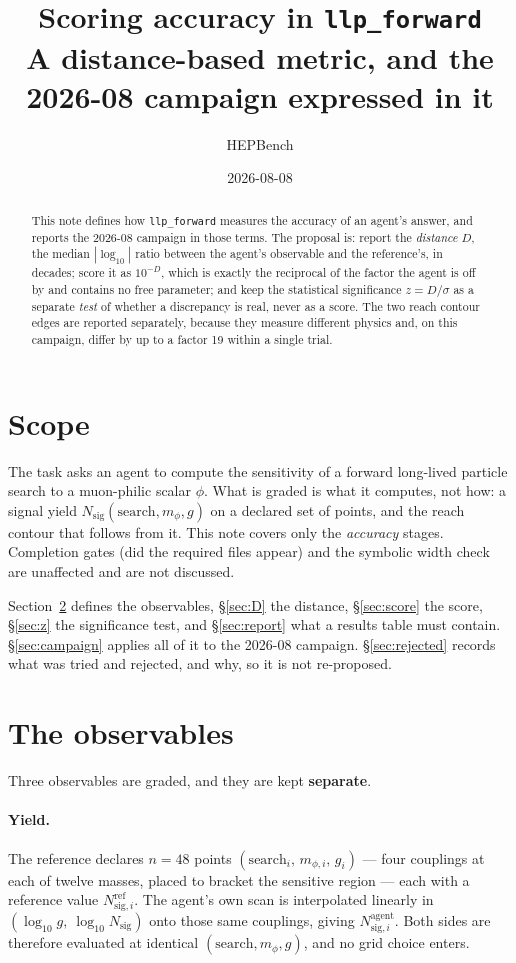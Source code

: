 \documentclass[11pt]{article}
\title{Scoring accuracy in \texttt{llp\_forward}\\
\large A distance-based metric, and the 2026-08 campaign expressed in it}
\author{HEPBench}
\date{2026-08-08}
\newcommand{\Nsig}{N_{\mathrm{sig}}}
\newcommand{\mphi}{m_\phi}
\begin{document}
\maketitle

\begin{abstract}
\noindent
This note defines how \texttt{llp\_forward} measures the accuracy of an agent's
answer, and reports the 2026-08 campaign in those terms. The proposal is: report
the \emph{distance} $D$, the median $|\log_{10}|$ ratio between the agent's
observable and the reference's, in decades; score it as $10^{-D}$, which is
exactly the reciprocal of the factor the agent is off by and contains no free
parameter; and keep the statistical significance $z=D/\sigma$ as a separate
\emph{test} of whether a discrepancy is real, never as a score. The two reach
contour edges are reported separately, because they measure different physics
and, on this campaign, differ by up to a factor 19 within a single trial.
\end{abstract}

\section{Scope}

The task asks an agent to compute the sensitivity of a forward long-lived
particle search to a muon-philic scalar $\phi$. What is graded is what it
computes, not how: a signal yield $\Nsig(\mathrm{search},\mphi,g)$ on a declared
set of points, and the reach contour that follows from it. This note covers only
the \emph{accuracy} stages. Completion gates (did the required files appear) and
the symbolic width check are unaffected and are not discussed.

Section~\ref{sec:obs} defines the observables, \S\ref{sec:D} the distance,
\S\ref{sec:score} the score, \S\ref{sec:z} the significance test, and
\S\ref{sec:report} what a results table must contain. \S\ref{sec:campaign}
applies all of it to the 2026-08 campaign. \S\ref{sec:rejected} records what was
tried and rejected, and why, so it is not re-proposed.

\section{The observables}\label{sec:obs}

Three observables are graded, and they are kept \textbf{separate}.

\paragraph{Yield.} The reference declares $n=48$ points
$(\mathrm{search}_i,\, m_{\phi,i},\, g_i)$ --- four couplings at each of twelve masses,
placed to bracket the sensitive region --- each with a reference value
$N^{\mathrm{ref}}_{\mathrm{sig},i}$. The agent's own scan is interpolated linearly in
$(\log_{10} g,\ \log_{10}\Nsig)$ onto those same couplings, giving
$N^{\mathrm{agent}}_{\mathrm{sig},i}$. Both sides are therefore evaluated at identical
$(\mathrm{search},\mphi,g)$, and no grid choice enters.
\end{document}
